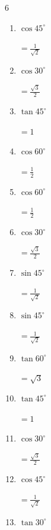 \begin{multicols}{6}
\begin{enumerate}
        $\displaystyle =\frac{\sqrt{3}}{2}$

  \item $\displaystyle \cos{45^\circ}$

        $\displaystyle =\frac{1}{\sqrt{2}}$

  \item $\displaystyle \cos{30^\circ}$

        $\displaystyle =\frac{\sqrt{3}}{2}$

  \item $\displaystyle \tan{45^\circ}$

        $\displaystyle =1$

  \item $\displaystyle \cos{60^\circ}$

        $\displaystyle =\frac{1}{2}$

\columnbreak %

  \item $\displaystyle \cos{60^\circ}$

        $\displaystyle =\frac{1}{2}$

  \item $\displaystyle \cos{30^\circ}$

        $\displaystyle =\frac{\sqrt{3}}{2}$

  \item $\displaystyle \sin{45^\circ}$

        $\displaystyle =\frac{1}{\sqrt{2}}$

  \item $\displaystyle \sin{45^\circ}$

        $\displaystyle =\frac{1}{\sqrt{2}}$

  \item $\displaystyle \tan{60^\circ}$

        $\displaystyle =\sqrt{3}$

  \item $\displaystyle \tan{45^\circ}$

        $\displaystyle =1$

  \item $\displaystyle \cos{30^\circ}$

        $\displaystyle =\frac{\sqrt{3}}{2}$

  \item $\displaystyle \cos{45^\circ}$

        $\displaystyle =\frac{1}{\sqrt{2}}$

  \item $\displaystyle \tan{30^\circ}$


\end{enumerate}
\end{multicols}
